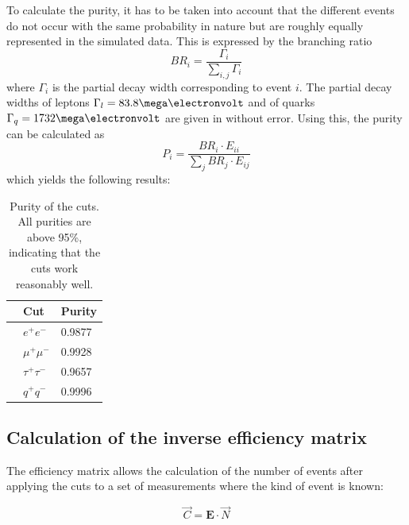 To calculate the purity, it has to be taken into account that the different events do not occur with the same probability in nature but are roughly equally represented in the simulated data. This is expressed by the branching ratio
\begin{equation}
BR_i=\frac{\Gamma_i}{\sum_{i,j}\Gamma_{i}}
\end{equation}
where $\Gamma_i$ is the partial decay width corresponding to event $i$. The partial decay widths of leptons $\Gamma_l=\unit{83.8}{\mega\electronvolt}$ and of quarks $\Gamma_q=\unit{1732}{\mega\electronvolt}$ are given in \cite{staatsex} without error.
Using this, the purity can be calculated as
\begin{equation}
P_i=\frac{BR_i\cdot E_{ii}}{\sum_{j}BR_j\cdot E_{ij}}
\end{equation}
which yields the following results:

\begin{table}[H]\centering
	\begin{tabular}{@{}lll@{}}
		\toprule
		&Cut&Purity\\
		\midrule
		&$e^+e^-$&0.9877\\
		&$\mu^+\mu^-$&0.9928\\
		&$\tau^+\tau^-$&0.9657\\
		&$q^+q^-$&0.9996\\
		\bottomrule
	\end{tabular}
	\caption[Purity of the cuts]{Purity of the cuts. All purities are above 95\%, indicating that the cuts work reasonably well.}
	\label{tb:purity}
\end{table}

\subsection{Calculation of the inverse efficiency matrix}
The efficiency matrix allows the calculation of the number of events after applying the cuts to a set of measurements where the kind of event is known:

\begin{equation}
\vec{C}=\boldsymbol{E}\cdot\vec{N}
\end{equation} 

